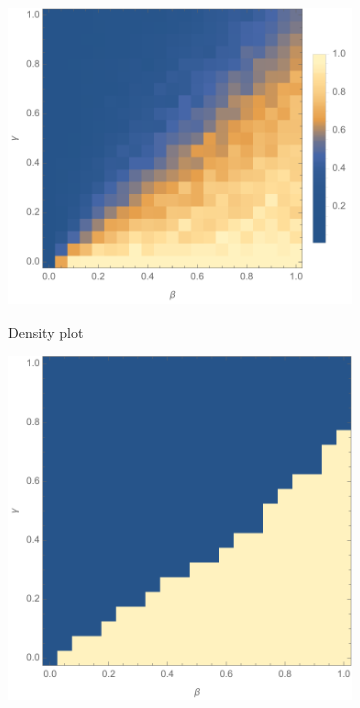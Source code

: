 \documentclass[11pt]{article}
\begin{document}
\begin{figure}[t]
	\centering
	\begin{subfigure}[t]{0.535\textwidth}
    	\includegraphics[trim = 0mm 2mm 0mm 0mm, clip, width=\textwidth]{beta_gamma_omega1_alpha0_tau0_expk2_runs50_nocut_notitle.pdf}
        \label{fig:beta_gamma_nocut}
        \caption{Density plot}
	\end{subfigure}
 	\begin{subfigure}[t]{0.45\textwidth}
    	\includegraphics[width=\textwidth]{beta_gamma_omega1_alpha0_tau0_expk2_runs50_cut05_notitle.pdf}

\end{subfigure}
\end{figure}
\end{document}
